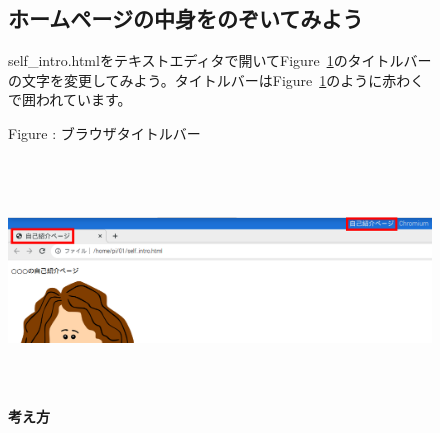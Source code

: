 \documentclass[a4paper,12pt]{jarticle}
\begin{document}
\clearpage
\begin{figure}[ht]
  \subsection{\theExercise ホームページの中身をのぞいてみよう}
  self\_intro.htmlをテキストエディタで開いてFigure~\ref{seq:refFigure31}のタイトルバーの文字を変更してみよう。タイトルバーはFigure~\ref{seq:refFigure31}のように赤わくで囲われています。


  \bigskip



  \centering
  \begin{minipage}{17.006cm}
    {\upshape
      Figure {\theFigure\label{seq:refFigure31}}:
      ブラウザタイトルバー}
  \end{minipage}

  \centering
  \includegraphics[width=17.006cm,height=6.482cm]{textbook-img143.png}
  \flushleft
  \textbf{考え方}


\end{figure}
\end{document}
